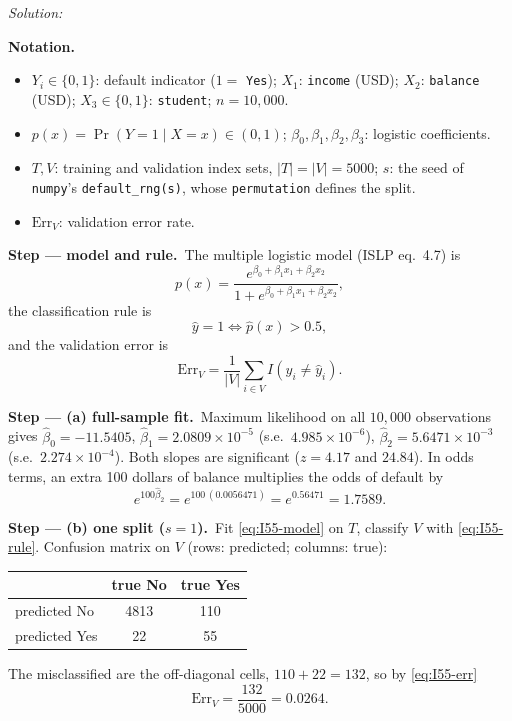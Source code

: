 \documentclass[11pt,a4paper]{article}
\newif\ifsolucoes
\newcommand{\espacoresol}{3.5cm}   %
\numberwithin{equation}{questao}   %
\newenvironment{notacao}{\par\smallskip\noindent\textbf{Notation.}\begin{itemize}[leftmargin=1.4em,topsep=1pt,itemsep=0pt]\small}{\end{itemize}}
\newcommand{\resolespaco}{\ifsolucoes\else\par\textit{Solution:}\vspace{\espacoresol}\par\fi}
\newcommand{\passo}[2]{\par\smallskip\noindent\textbf{Step --- #1.}~#2}
\begin{document}
\resolespaco
\begin{sol}
\begin{notacao}
\item $Y_i\in\{0,1\}$: default indicator ($1=$ \texttt{Yes}); $X_{1}$: \texttt{income} (USD);
  $X_{2}$: \texttt{balance} (USD); $X_3\in\{0,1\}$: \texttt{student}; $n=10{,}000$.
\item $p(x)=\Pr(Y=1\mid X=x)\in(0,1)$; $\beta_0,\beta_1,\beta_2,\beta_3$: logistic coefficients.
\item $T,V$: training and validation index sets, $|T|=|V|=5000$; $s$: the seed of
  \texttt{numpy}'s \texttt{default\_rng(s)}, whose \texttt{permutation} defines the split.
\item $\mathrm{Err}_V$: validation error rate.
\end{notacao}

\passo{model and rule}{The multiple logistic model (ISLP eq.~4.7) is
\begin{equation}\label{eq:I55-model}
p(x)=\frac{e^{\beta_0+\beta_1x_1+\beta_2x_2}}{1+e^{\beta_0+\beta_1x_1+\beta_2x_2}},
\end{equation}
the classification rule is
\begin{equation}\label{eq:I55-rule}
\hat y=1 \iff \hat p(x)>0.5,
\end{equation}
and the validation error is
\begin{equation}\label{eq:I55-err}
\mathrm{Err}_V=\frac1{|V|}\sum_{i\in V}I(y_i\neq\hat y_i).
\end{equation}}

\passo{(a) full-sample fit}{Maximum likelihood on all $10{,}000$ observations gives
$\hat\beta_0=-11.5405$, $\hat\beta_1=2.0809\times10^{-5}$ (s.e.\ $4.985\times10^{-6}$),
$\hat\beta_2=5.6471\times10^{-3}$ (s.e.\ $2.274\times10^{-4}$). Both slopes are significant
($z=4.17$ and $24.84$). In odds terms, an extra 100 dollars of balance multiplies the odds of
default by
\begin{equation}\label{eq:I55-or}
e^{100\hat\beta_2}=e^{100\,(0.0056471)}=e^{0.56471}=1.7589 .
\end{equation}}

\passo{(b) one split ($s=1$)}{Fit \eqref{eq:I55-model} on $T$, classify $V$ with
\eqref{eq:I55-rule}. Confusion matrix on $V$ (rows: predicted; columns: true):
\begin{center}\begin{tabular}{lcc}\toprule
 & true No & true Yes\\\midrule
predicted No & 4813 & 110\\
predicted Yes & 22 & 55\\\bottomrule\end{tabular}\end{center}
The misclassified are the off-diagonal cells, $110+22=132$, so by \eqref{eq:I55-err}
\begin{equation}\label{eq:I55-b}
\mathrm{Err}_V=\frac{132}{5000}=0.0264 .
\end{equation}}


\end{sol}
\end{document}
